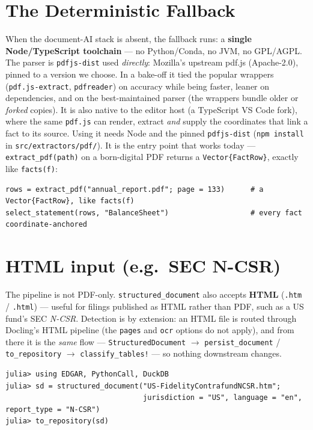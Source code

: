 \documentclass[11pt,a4paper]{report}
\begin{document}
\section{The Deterministic Fallback}
\label{sec:pdf-fallback}

When the document-AI stack is absent, the fallback runs: a \textbf{single Node/TypeScript toolchain} ---
no Python/Conda, no JVM, no GPL/AGPL. The parser is \texttt{pdfjs-dist} used \emph{directly}: Mozilla's
upstream pdf.js (Apache-2.0), pinned to a version we choose. In a bake-off it tied the popular wrappers
(\texttt{pdf.js-extract}, \texttt{pdfreader}) on accuracy while being faster, leaner on dependencies, and
on the best-maintained parser (the wrappers bundle older or \emph{forked} copies). It is also native to
the editor host (a TypeScript VS Code fork), where the same \texttt{pdf.js} can render, extract \emph{and}
supply the coordinates that link a fact to its source. Using it needs Node and the pinned
\texttt{pdfjs-dist} (\texttt{npm install} in \texttt{src/extractors/pdf/}). It is the entry point that
works today --- \texttt{extract\_pdf(path)} on a born-digital PDF returns a \texttt{Vector\{FactRow\}},
exactly like \texttt{facts(f)}:

\begin{lstlisting}
rows = extract_pdf("annual_report.pdf"; page = 133)      # a Vector{FactRow}, like facts(f)
select_statement(rows, "BalanceSheet")                   # every fact coordinate-anchored
\end{lstlisting}

\section{HTML input (e.g.\ SEC N-CSR)}
\label{sec:html-input}

The pipeline is not PDF-only. \texttt{structured\_document} also accepts \textbf{HTML} (\texttt{.htm} /
\texttt{.html}) --- useful for filings published as HTML rather than PDF, such as a US fund's SEC
\emph{N-CSR}. Detection is by extension: an HTML file is routed through Docling's HTML pipeline (the
\texttt{pages} and \texttt{ocr} options do not apply), and from there it is the \emph{same} flow ---
\texttt{StructuredDocument} $\rightarrow$ \texttt{persist\_document} / \texttt{to\_repository}
$\rightarrow$ \texttt{classify\_tables!} --- so nothing downstream changes.

\begin{lstlisting}
julia> using EDGAR, PythonCall, DuckDB
julia> sd = structured_document("US-FidelityContrafundNCSR.htm";
                                jurisdiction = "US", language = "en", report_type = "N-CSR")
julia> to_repository(sd)
\end{lstlisting}
\end{document}
